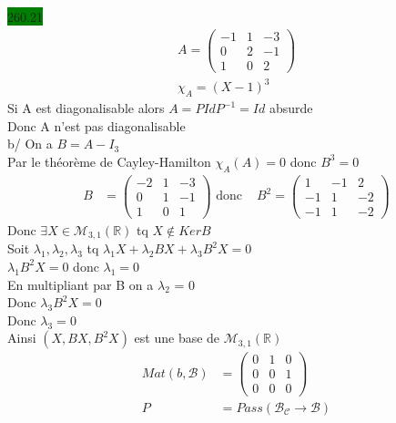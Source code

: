 \documentclass{article}
\begin{document}
\noindent \colorbox{green}{260.21}\\
\begin{align*}
    A = \begin{pmatrix}
        -1 & 1 & -3\\ 0 & 2 & -1 \\ 1& 0 & 2
    \end{pmatrix}\\
    \chi_A = (X-1)^3
\end{align*}
Si A est diagonalisable alors \(A = PIdP^{-1} = Id\) absurde\\
Donc A n'est pas diagonalisable\\
b/ On a \(B = A -I_3\)\\
Par le théorème de Cayley-Hamilton \(\chi_A(A) = 0\) donc \(B^3 = 0\)\\
\begin{align*}
    B &= \begin{pmatrix}
        -2 & 1 & -3\\0& 1& -1\\1&0&1
    \end{pmatrix} \text{ donc } &B^2 = \begin{pmatrix}
        1&-1&2\\-1&1&-2\\-1&1&-2
    \end{pmatrix}
\end{align*}
Donc \(\exists X \in \mathcal{M}_{3,1}(\mathbb{R})\) tq \(X \notin KerB\)\\
Soit \(\lambda_1, \lambda_2, \lambda_3\) tq \(\lambda_1 X + \lambda_2 B X + \lambda_3 B^2 X = 0\)\\
\(\lambda_1B^2 X = 0\) donc \(\lambda_1 = 0\)\\
En multipliant par B on a \(\lambda_2\) = 0\\
Donc \(\lambda_3 B^2 X = 0\)\\
Donc  \(\lambda_3 = 0\)\\
Ainsi \((X, BX, B^2X)\) est une base de \(\mathcal{M}_{3,1}(\mathbb{R})\)\\
\begin{align*}
    Mat(b, \mathcal{B}) &= \begin{pmatrix}
        0 & 1 & 0 \\ 0 & 0 & 1\\ 0 & 0 & 0 
    \end{pmatrix}\\
    P&= Pass(\mathcal{B}_\mathcal{C} \to \mathcal{B})
\end{align*}
\end{document}

